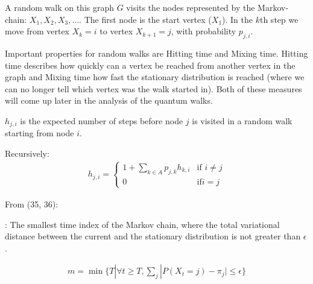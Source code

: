 A random walk on this graph $G$ visits the nodes represented by the Markov-chain: $X_1, X_2, X_3, \dots$. The first node is the start vertex ($X_1$). In the $k$th step we move from vertex $X_k=i$ to vertex $X_{k+1}=j$, with probability $p_{j,i}$.

Important properties for random walks are Hitting time and Mixing time. Hitting time describes how quickly can a vertex be reached from another vertex in the graph and Mixing time how fast the stationary distribution is reached (where we can no longer tell which vertex was the walk started in). Both of these measures will come up later in the analysis of the quantum walks.

 $h_{j,i}$ is the expected number of steps before node $j$ is visited in a random walk starting from node $i$.

Recursively:
\begin{align}
h_{j,i} = \left\{\begin{array}{lr}
1 + \sum\limits_{k\in{}A}p_{j,k}h_{k,i} & \text{if } i\neq{}j\\
0 & \text{if} i=j
\end{array}
\end{align}

From \cite{KempeIntroduction} (35, 36):

: The smallest time index of the Markov chain, where the total variational distance between the current and the stationary distribution is not greater than $\epsilon$.

\begin{align}
m = \min\{T | \forall{}t\geq{}T, \sum\limits_{j}|P(X_t = j) - \pi_j| \leq \epsilon\}
\end{align}

